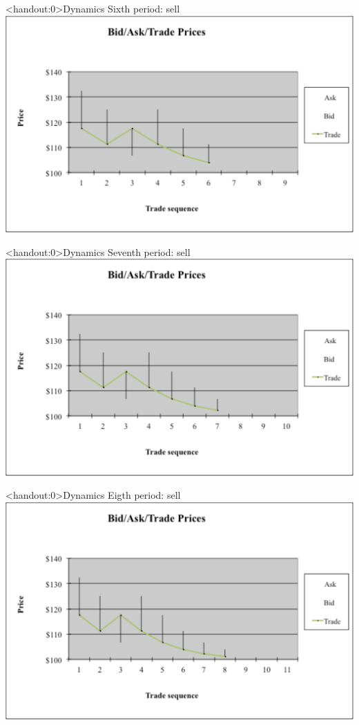 \documentclass[english,10pt]{beamer}
\begin{document}
\begin{frame}<handout:0>{Dynamics}
	Sixth period: sell
	\center
	\includegraphics[width=0.9\linewidth]{pics/P6_Image.pdf}
\end{frame}


\begin{frame}<handout:0>{Dynamics}
	Seventh period: sell
	\center
	\includegraphics[width=0.9\linewidth]{pics/P7_Image.pdf}
\end{frame}


\begin{frame}<handout:0>{Dynamics}
	Eigth period: sell
	\center
	\includegraphics[width=0.9\linewidth]{pics/P8_Image.pdf}
\end{frame}
\end{document}
